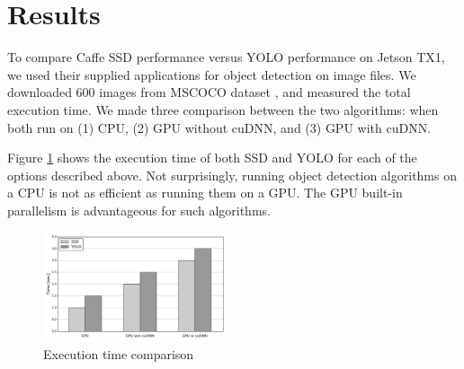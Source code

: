 \section{Results} 
\label{sec:results}

To compare Caffe SSD performance versus YOLO performance on Jetson TX1, we used their supplied applications for object detection on image files.
We downloaded 600 images from MSCOCO dataset \cite{mscoco}, and measured the total execution time. We made three comparison between the two algorithms: when both run on (1) CPU, (2) GPU without cuDNN, and (3) GPU with cuDNN\footnotemark.


Figure \ref{fig:t_exec} shows the execution time of both SSD and YOLO for each of the options described above.
Not surprisingly, running object detection algorithms on a CPU is not as efficient as running them on a GPU. The GPU built-in parallelism is advantageous for such algorithms. 



\begin{figure}[h]
	\includegraphics[width=0.48\textwidth]{./imgs/t_exec.pdf}
	\caption{Execution time comparison}
	\label{fig:t_exec}
\end{figure}